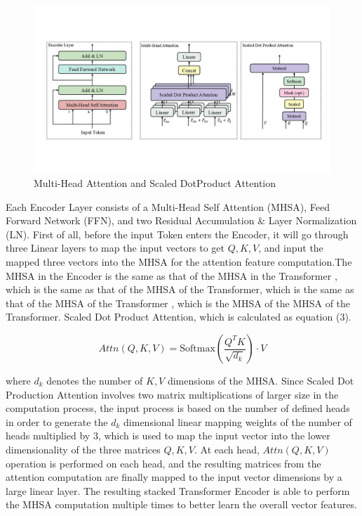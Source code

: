 \documentclass{article}
\begin{document}
\begin{figure}[htbp]
	\centering
	\includegraphics[scale=0.45]{figure/p3.jpg}
	\caption{Multi-Head Attention and Scaled DotProduct Attention}\label{fig:p3}
\end{figure}

Each Encoder Layer consists of a Multi-Head Self Attention (MHSA), Feed Forward Network (FFN), and two Residual Accumulation \& Layer Normalization (LN). First of all, before the input Token enters the Encoder, it will go through three Linear layers to map the input vectors to get $Q,K,V$, and input the mapped three vectors into the MHSA for the attention feature computation.The MHSA in the Encoder is the same as that of the MHSA in the Transformer \cite{9}, which is the same as that of the MHSA of the Transformer, which is the same as that of the MHSA of the Transformer \cite{9}, which is the MHSA of the MHSA of the Transformer. Scaled Dot Product Attention, which is calculated as equation (3).

\begin{equation}\label{e3}
	Attn(Q,K,V)=\mbox{Softmax}(\frac{Q^T K}{\sqrt{d_k }})\cdot V
\end{equation}


where $d_k$ denotes the number of $K,V$ dimensions of the MHSA. Since Scaled Dot Production Attention involves two matrix multiplications of larger size in the computation process, the input process is based on the number of defined heads in order to generate the $d_k$ dimensional linear mapping weights of the number of heads multiplied by 3, which is used to map the input vector into the lower dimensionality of the three matrices $Q,K,V$. At each head, $Attn(Q,K,V ) $operation is performed on each head, and the resulting matrices from the attention computation are finally mapped to the input vector dimensions by a large linear layer. The resulting stacked Transformer Encoder is able to perform the MHSA computation multiple times to better learn the overall vector features.
\end{document}
